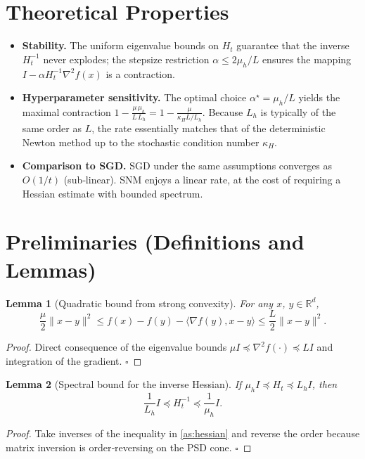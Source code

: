 \documentclass{article}
\newtheorem{lemma}{Lemma}
\newcommand{\R}{\mathbb{R}}
\begin{document}
\section*{Theoretical Properties}
\begin{itemize}
\item \textbf{Stability.} The uniform eigenvalue bounds on $H_{t}$ guarantee that the inverse $H_{t}^{-1}$ never explodes; the stepsize restriction $\alpha\le 2\mu_{h}/L$ ensures the mapping $I-\alpha H_{t}^{-1}\nabla^{2}f(x)$ is a contraction.
\item \textbf{Hyperparameter sensitivity.} The optimal choice $\alpha^{\star}= \mu_{h}/L$ yields the maximal contraction $1-\frac{\mu\,\mu_{h}}{L\,L_{h}}=1-\frac{\mu}{\kappa_{H}L/L_{h}}$. Because $L_{h}$ is typically of the same order as $L$, the rate essentially matches that of the deterministic Newton method up to the stochastic condition number $\kappa_{H}$.
\item \textbf{Comparison to SGD.} SG\!D under the same assumptions converges as $O(1/t)$ (sub‑linear). SNM enjoys a linear rate, at the cost of requiring a Hessian estimate with bounded spectrum.
\end{itemize}

\newpage

\section*{Preliminaries (Definitions and Lemmas)}
\begin{lemma}[Quadratic bound from strong convexity]\label{lem:strong}
For any $x$, $y\in\R^{d}$,
\[
\frac{\mu}{2}\|x-y\|^{2}\le f(x)-f(y)-\langle\nabla f(y),x-y\rangle\le \frac{L}{2}\|x-y\|^{2}.
\]
\end{lemma}
\begin{proof}
Direct consequence of the eigenvalue bounds $\mu I\preceq\nabla^{2}f(\cdot)\preceq L I$ and integration of the gradient. \hfill $\square$
\end{proof}

\begin{lemma}[Spectral bound for the inverse Hessian]\label{lem:inv}
If $\mu_{h} I\preceq H_{t}\preceq L_{h} I$, then
\[
\frac{1}{L_{h}} I\preceq H_{t}^{-1}\preceq\frac{1}{\mu_{h}} I.
\]
\end{lemma}
\begin{proof}
Take inverses of the inequality in \ref{as:hessian} and reverse the order because matrix inversion is order‑reversing on the PSD cone. \hfill $\square$
\end{proof}
\end{document}
